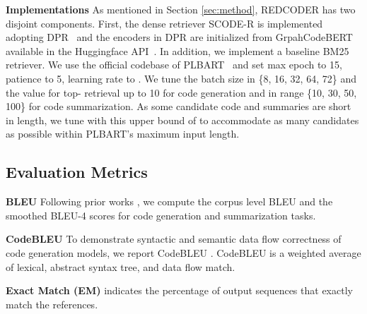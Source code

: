 \documentclass[11pt]{article}
\newcommand{\tool}{{REDCODER}\xspace}
\newcommand{\coder}{SCODE-R\xspace}
\begin{document}
\smallskip\noindent\textbf{Implementations\hspace{0.5em}} 
As mentioned in Section \ref{sec:method}, \tool has two disjoint components.
First, the dense retriever \coder is implemented adopting DPR~\cite{karpukhin-etal-2020-dense} and the encoders in DPR are initialized from  GrpahCodeBERT available in the Huggingface API~\cite{wolf-etal-2020-transformers}. 
In addition, we implement a baseline BM25 retriever.
We use the official codebase of PLBART~\cite{ahmad2021unified} and set max epoch to 15, patience to 5, learning rate to .
We tune the batch size in \{8, 16, 32, 64, 72\} and the  value for top- retrieval up to 10  for code generation and in range \{10, 30, 50, 100\} for code summarization. 
As some candidate code and summaries are short in length, we tune with this upper bound of  to accommodate as many candidates as possible within PLBART's maximum input length.



\subsection{Evaluation Metrics}
\noindent\textbf{BLEU\hspace{0.5em}} 
Following prior works \cite{ahmad2021unified, feng2020codebert}, we compute the corpus level BLEU \cite{papineni-etal-2002-bleu} and the smoothed BLEU-4 \cite{lin-och-2004-orange} scores for code generation and summarization tasks.



\smallskip
\noindent\textbf{{CodeBLEU}\hspace{0.5em}} 
To demonstrate syntactic and semantic data flow correctness of code generation models, we report CodeBLEU \cite{ren2020codebleu}.
CodeBLEU is a weighted average of lexical, abstract syntax tree, and data flow match.





\smallskip
\noindent\textbf{{Exact Match (EM)}\hspace{0.5em}} 
indicates the percentage of output sequences that exactly match the references.
\end{document}
